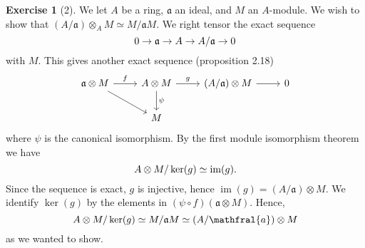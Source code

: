 \documentclass{article}
\theoremstyle{definition}
\newtheorem*{exercise}{Exercise}
\DeclareMathOperator{\im}{im}
\begin{document}
\begin{exercise}[2]
    We let $A$ be a ring, $\mathfrak{a}$ an ideal, and $M$ an $A$-module. We
    wish to show that $(A / \mathfrak{a}) \otimes_A M \simeq M /
    \mathfrak{a}M$. We right tensor the exact sequence
    \begin{equation}
        \notag
        0 \to \mathfrak{a} \to A \to A / \mathfrak{a} \to 0
    \end{equation}
    with $M$. This gives another exact sequence (proposition 2.18)
    \[
    \begin{tikzcd}
        \mathfrak{a} \otimes M \arrow{r}{f} \arrow{dr} & A \otimes M \arrow{r}{g} \arrow{d}{\psi} &(A / \mathfrak{a}) \otimes M \arrow{r} & 0 \\
        & M
    \end{tikzcd}
    \]
    where $\psi$ is the canonical isomorphism. By the first module isomorphism
    theorem we have
    \begin{equation}
        \notag
        A \otimes M / \ker(g) \simeq \im(g).
    \end{equation}
    Since the sequence is exact, $g$ is injective, hence $\im(g) = \left( A /
    \mathfrak{a} \right) \otimes M$. We identify $\ker(g)$ by the elements in
    $(\psi \circ f)(\mathfrak{a} \otimes M)$. Hence,
    \begin{equation}
        \notag
        A \otimes M / \ker(g) \simeq M / \mathfrak{a}M \simeq \left( A /
        \mathfral{a} \right) \otimes M
    \end{equation}
    as we wanted to show.
\end{exercise}
\end{document}
